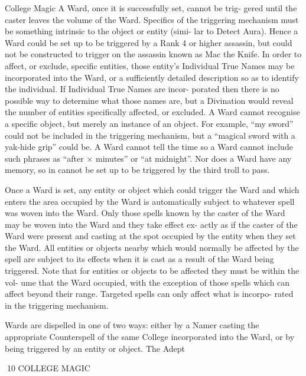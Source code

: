 \begin{Chapter}{College Magic}
A Ward, once it is successfully set, cannot be trig-
gered  until  the  caster  leaves  the  volume  of  the 
Ward.  Specifics  of  the  triggering  mechanism must 
be something intrinsic to the object or entity (simi-
lar to Detect Aura). Hence a Ward could be set up 
to be triggered by a Rank 4 or higher assassin, but 
could not be  constructed to  trigger  on  the  assassin 
known  as  Mac  the  Knife.  In  order  to  affect,  or 
exclude,  specific  entities,  those  entity’s  Individual 
True Names may be incorporated into the Ward, or 
a  sufficiently  detailed  description  so  as  to  identify 
the individual. If Individual True Names are incor-
porated then there is no possible way to determine 
what  those  names  are,  but  a  Divination  would 
reveal  the  number  of  entities  specifically  affected, 
or  excluded.  A  Ward  cannot  recognise  a  specific 
object,  but  merely  an  instance  of  an  object.  For 
example, “my sword” could not be included in the 
triggering mechanism, but a “magical sword with a 
yak-hide  grip”  could  be.  A  Ward  cannot  tell  the 
time  so  a  Ward  cannot  include  such  phrases  as 
“after  ×  minutes”  or  “at  midnight”.  Nor  does  a 
Ward have any memory, so in cannot be set up to 
be triggered by the third troll to pass. 

Once  a  Ward  is  set,  any  entity  or  object  which 
could  trigger  the  Ward  and  which  enters  the  area 
occupied  by  the  Ward  is  automatically  subject  to 
whatever  spell  was  woven  into  the  Ward.  Only 
those spells known by the caster of the Ward may 
be  woven  into  the  Ward  and  they  take  effect  ex-
actly as if the caster of the Ward were present and 
casting  at  the  spot  occupied  by  the  entity  when 
they  set  the  Ward.  All  entities  or  objects  nearby 
which would normally be affected by the spell are 
subject  to  its  effects  when  it  is  cast  as  a  result  of 
the Ward  being  triggered.  Note  that for  entities  or 
objects to be affected they must be within the vol-
ume that the Ward occupied, with the exception of 
those  spells  which  can  affect  beyond  their  range. 
Targeted  spells  can  only  affect  what  is  incorpo-
rated in the triggering mechanism. 

Wards are dispelled in one of two ways: either by a 
Namer  casting  the  appropriate  Counterspell  of  the 
same  College  incorporated  into  the  Ward,  or  by 
being  triggered  by  an  entity  or  object.  The  Adept 

10 COLLEGE MAGIC 


\end{Chapter}
